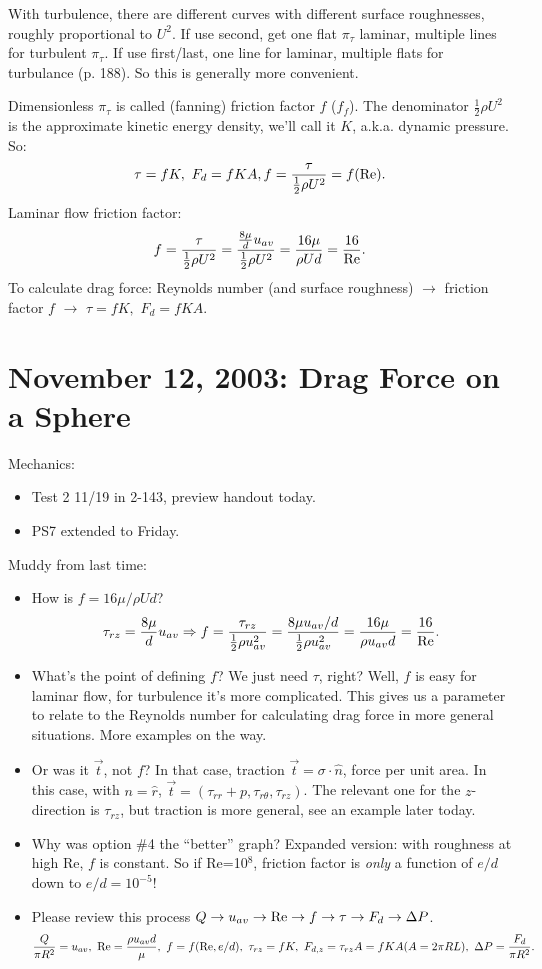 \documentclass{report}
\begin{document}
With turbulence, there are different curves with different surface roughnesses,
roughly proportional to $U^2$.  If use second, get one flat $\pi_\tau$ laminar,
multiple lines for turbulent $\pi_\tau$.  If use first/last, one line for
laminar, multiple flats for turbulance (p. 188).  So this is generally more
convenient.

Dimensionless $\pi_\tau$ is called (fanning) friction factor $f$ ($f_f$).  The
denominator $\frac{1}{2}\rho U^2$ is the approximate kinetic energy density,
we'll call it $K$, a.k.a. dynamic pressure.  So:
$$\tau=fK,\ F_d = fKA, f=\frac{\tau}{\frac{1}{2}\rho U^2} = f({\rm Re}).$$
Laminar flow friction factor:
$$f=\frac{\tau}{\frac{1}{2}\rho U^2} =
\frac{\frac{8\mu}{d}u_{av}}{\frac{1}{2}\rho U^2} = \frac{16\mu}{\rho Ud} =
\frac{16}{\rm Re}.$$
To calculate drag force:  Reynolds number (and surface roughness) $\rightarrow$
friction factor $f$ $\rightarrow$ $\tau=fK,$ $F_d=fKA$.
\newpage


\section{November 12, 2003: Drag Force on a Sphere}

Mechanics:
\begin{itemize}
\item Test 2 11/19 in 2-143, preview handout today.
\item PS7 extended to Friday.
\end{itemize}

\noindent Muddy from last time:
\begin{itemize}
\item How is $f=16\mu/\rho Ud$?
  $$\tau_{rz} = \frac{8\mu}{d}u_{av}\Rightarrow
  f=\frac{\tau_{rz}}{\frac{1}{2}\rho u_{av}^2} =
  \frac{8\mu u_{av}/d}{\frac{1}{2}\rho u_{av}^2} = \frac{16\mu}{\rho u_{av}d} =
  \frac{16}{\rm Re}.$$
\item What's the point of defining $f$?  We just need $\tau$, right?  Well, $f$
  is easy for laminar flow, for turbulence it's more complicated.  This gives
  us a parameter to relate to the Reynolds number for calculating drag force in
  more general situations.  More examples on the way.
\item Or was it $\vec{t}$, not $f$?  In that case, traction
  $\vec{t}=\sigma\cdot\hat{n}$, force per unit area.  In this case, with
  $n=\hat{r}$, $\vec{t}=(\tau_{rr}+p, \tau_{r\theta}, \tau_{rz})$.  The
  relevant one for the $z$-direction is $\tau_{rz}$, but traction is more
  general, see an example later today.
\item Why was option \#4 the ``better'' graph?  Expanded version: with
  roughness at high Re, $f$ is constant.  So if Re=10$^8$, friction factor is
  {\em only} a function of $e/d$ down to $e/d=10^{-5}$!
\item Please review this process $Q\rightarrow u_{av}\rightarrow{\rm
    Re}\rightarrow f\rightarrow\tau\rightarrow F_d\rightarrow\Delta P$.
  $$\frac{Q}{\pi R^2}=u_{av},\ {\rm Re}=\frac{\rho u_{av}d}{\mu},\ f=f({\rm
    Re}, e/d),\ \tau_{rz}=fK,\ F_{d,z}=\tau_{rz} A=fKA (A=2\pi RL),\ \Delta P=\frac{F_d}{\pi
    R^2}.$$
\end{itemize}
\end{document}
